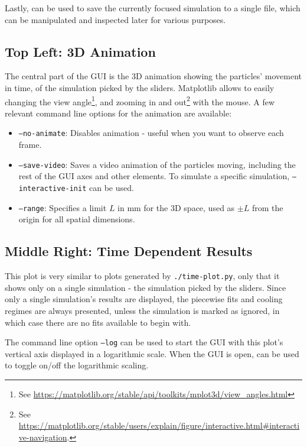 Lastly,  can be used to save the currently focused simulation to a single file, which can be manipulated and inspected later for various purposes.

\subsection{Top Left: 3D Animation}\label{ssec:manual/plot-3d-anim}

The central part of the GUI is the 3D animation showing the particles' movement in time, of the simulation picked by the sliders. Matplotlib allows to easily changing the view angle\footnote{See \url{https://matplotlib.org/stable/api/toolkits/mplot3d/view_angles.html}}, and zooming in and out\footnote{See \url{https://matplotlib.org/stable/users/explain/figure/interactive.html\#interactive-navigation}.} with the mouse. A few relevant command line options for the animation are available:

\begin{itemize}
	\item \texttt{--no-animate}: Disables animation - useful when you want to observe each frame.
	\item \texttt{--save-video}: Saves a video animation of the particles moving, including the rest of the GUI axes and other elements. To simulate a specific simulation, \texttt{--interactive-init} can be used.
	\item \texttt{--range}: Specifies a limit $L$ in $\mathrm{mm}$ for the 3D space, used as $\pm L$ from the origin for all spatial dimensions.
\end{itemize}

\subsection{Middle Right: Time Dependent Results}\label{ssec:manual/plot-time-dependent}

This plot is very similar to plots generated by \texttt{./time-plot.py}, only that it shows only on a single simulation - the simulation picked by the sliders. Since only a single simulation's results are displayed, the piecewise fits and cooling regimes are always presented, unless the simulation is marked as ignored, in which case there are no fits available to begin with.

The command line option \texttt{--log} can be used to start the GUI with this plot's vertical axis displayed in a logarithmic scale. When the GUI is open,  can be used to toggle on/off the logarithmic scaling.

